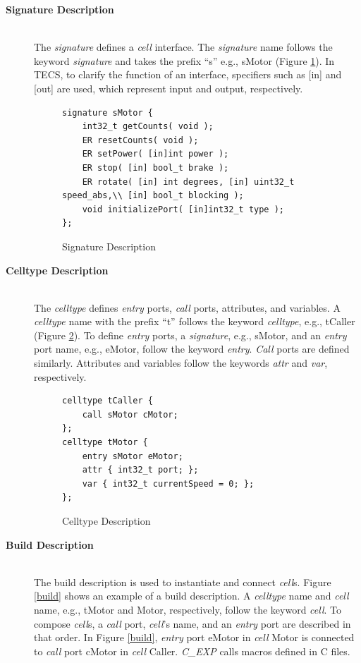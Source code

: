 \documentclass[conference]{IEEEtran/IEEEtran/IEEEtran}
\begin{document}
\begin{description}
    \item[{\bf Signature Description}]\mbox{}\\
        The {\it signature} defines a {\it cell} interface.
        The {\it signature} name follows the keyword {\it signature} and takes the prefix ``s'' e.g., sMotor (Figure \ref{signature}).
        In TECS, to clarify the function of an interface, specifiers such as [in] and [out] are used, which represent input and output, respectively.
\begin{figure}[ht]
\centering
\begin{lstlisting}
signature sMotor {
    int32_t getCounts( void );
    ER resetCounts( void );
    ER setPower( [in]int power );
    ER stop( [in] bool_t brake );
    ER rotate( [in] int degrees, [in] uint32_t speed_abs,\\ [in] bool_t blocking );
    void initializePort( [in]int32_t type );
};
\end{lstlisting}
    \vspace{-2mm}
\caption{Signature Description}
    \vspace{-2mm}
\label{signature}
\end{figure}
    \item[{\bf Celltype Description}]\mbox{}\\
        The {\it celltype} defines {\it entry} ports, {\it call} ports, attributes, and variables.
        A {\it celltype} name with the prefix ``t'' follows the keyword {\it celltype}, e.g., tCaller (Figure \ref{celltype}).
        To define {\it entry} ports, a {\it signature}, e.g., sMotor, and an {\it entry} port name, e.g., eMotor, follow the keyword {\it entry}.
        {\it Call} ports are defined similarly.
        Attributes and variables follow the keywords {\it attr} and {\it var}, respectively.
\begin{figure}[ht]
\centering
\begin{lstlisting}
celltype tCaller {
    call sMotor cMotor;
};
celltype tMotor {
    entry sMotor eMotor;
    attr { int32_t port; };
    var { int32_t currentSpeed = 0; };
};
\end{lstlisting}
    \vspace{-2mm}
\caption{Celltype Description}
    \vspace{-2mm}
\label{celltype}
\end{figure}
    \item[{\bf Build Description}]\mbox{}\\
        The build description is used to instantiate and connect {\it cell}s.
        Figure \ref{build} shows an example of a build description.
        A {\it celltype} name and {\it cell} name, e.g., tMotor and Motor, respectively, follow the keyword {\it cell}.
        To compose {\it cell}s, a {\it call} port, {\it cell}'s name, and an {\it entry} port are described in that order.
        In Figure \ref{build}, {\it entry} port eMotor in {\it cell} Motor is connected to {\it call} port cMotor in {\it cell} Caller.
        {\it C\_EXP} calls macros defined in C files.


\end{description}
\end{document}
